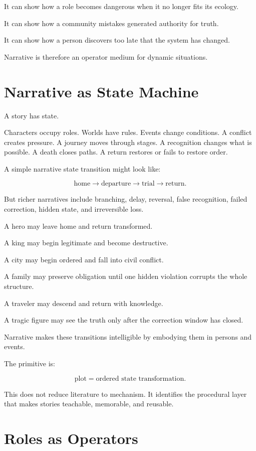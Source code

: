 \documentclass[11pt]{book}
\begin{document}
It can show how a role becomes dangerous when it no longer fits its ecology.

It can show how a community mistakes generated authority for truth.

It can show how a person discovers too late that the system has changed.

Narrative is therefore an operator medium for dynamic situations.

\section{Narrative as State Machine}

A story has state.

Characters occupy roles. Worlds have rules. Events change conditions. A conflict creates pressure. A journey moves through stages. A recognition changes what is possible. A death closes paths. A return restores or fails to restore order.

A simple narrative state transition might look like:

\[
\text{home} \rightarrow \text{departure} \rightarrow \text{trial} \rightarrow \text{return}.
\]

But richer narratives include branching, delay, reversal, false recognition, failed correction, hidden state, and irreversible loss.

A hero may leave home and return transformed.

A king may begin legitimate and become destructive.

A city may begin ordered and fall into civil conflict.

A family may preserve obligation until one hidden violation corrupts the whole structure.

A traveler may descend and return with knowledge.

A tragic figure may see the truth only after the correction window has closed.

Narrative makes these transitions intelligible by embodying them in persons and events.

The primitive is:

\[
\text{plot} = \text{ordered state transformation}.
\]

This does not reduce literature to mechanism. It identifies the procedural layer that makes stories teachable, memorable, and reusable.

\section{Roles as Operators}
\end{document}
